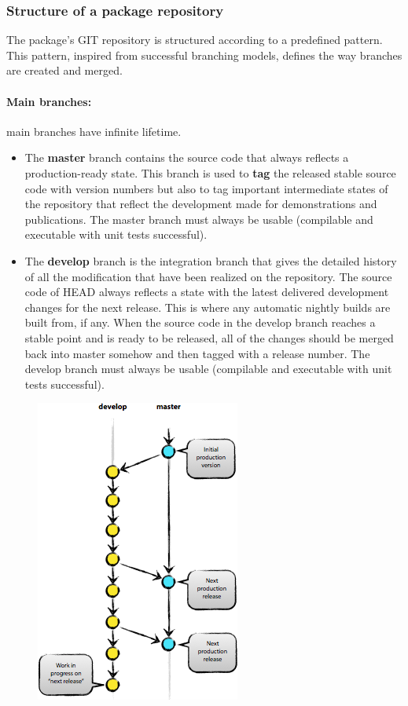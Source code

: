 \documentclass[12pt,a4paper]{article}
\begin{document}
\subsubsection{Structure of a package repository}

The package's GIT repository is structured according to a predefined pattern. This pattern, inspired from successful branching models, defines the way branches are created and merged. 

\paragraph{Main branches:} main branches have infinite lifetime.
\begin{itemize}
\item The \textbf{master} branch contains the source code that always reflects a production-ready state. This branch is used to \textbf{tag} the released stable source code with version numbers but also to tag important intermediate states of the repository that reflect the development made for demonstrations and publications. The master branch must always be usable (compilable and executable with unit tests successful).
\item The \textbf{develop} branch is the integration branch that gives the detailed history of all the modification that have been realized on the repository. The source code of HEAD always reflects a state with the latest delivered development changes for the next release. This is where any automatic nightly builds are built from, if any. When the source code in the develop branch reaches a stable point and is ready to be released, all of the changes should be merged back into master somehow and then tagged with a release number. The develop branch must always be usable (compilable and executable with unit tests successful).
\end{itemize}

\begin{figure}
\center
\includegraphics[scale=0.7]{images/permanentbranches.png}
\end{figure}
 
\end{document}
